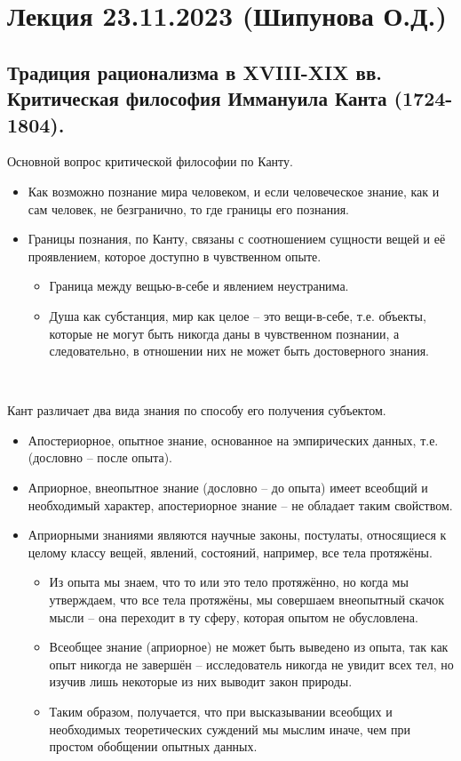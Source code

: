 \documentclass[main.tex]{subfiles}
\begin{document}
\section{Лекция 23.11.2023 (Шипунова О.Д.)}



\subsection{Традиция рационализма в XVIII-XIX вв. Критическая философия Иммануила Канта (1724-1804).}

{\parindent0pt
Основной вопрос критической философии по Канту.
\begin{itemize}[nosep,leftmargin=0.5cm]
\item Как возможно познание мира человеком, и если человеческое знание, как и сам человек, не безгранично, то где границы его познания.
\item Границы познания, по Канту, связаны с соотношением сущности вещей и её проявлением, которое доступно в чувственном опыте.
\begin{itemize}[nosep,leftmargin=0.6cm]
\item Граница между вещью-в-себе и явлением неустранима.
\item Душа как субстанция, мир как целое -- это вещи-в-себе, т.е. объекты, которые не могут быть никогда даны в чувственном познании, а следовательно, в отношении них не может быть достоверного знания.
\end{itemize}
\end{itemize}
}
\ 

{\parindent0pt
Кант различает два вида знания по способу его получения субъектом.
\begin{itemize}[nosep,leftmargin=0.5cm]
\item Апостериорное, опытное знание, основанное на эмпирических данных, т.е. (дословно -- после опыта).
\item Априорное, внеопытное знание (дословно -- до опыта) имеет всеобщий и необходимый характер, апостериорное знание -- не обладает таким свойством.
\item Априорными знаниями являются научные законы, постулаты, относящиеся к целому классу вещей, явлений, состояний, например, все тела протяжёны.
\begin{itemize}[nosep,leftmargin=0.6cm]
\item Из опыта мы знаем, что то или это тело протяжённо, но когда мы утверждаем, что все тела протяжёны, мы совершаем внеопытный скачок мысли -- она переходит в ту сферу, которая опытом не обусловлена.
\item Всеобщее знание (априорное) не может быть выведено из опыта, так как опыт никогда не завершён -- исследователь никогда не увидит всех тел, но изучив лишь некоторые из них выводит закон природы.
\item Таким образом, получается, что при высказывании всеобщих и необходимых теоретических суждений мы мыслим иначе, чем при простом обобщении опытных данных.
\end{itemize}
\end{itemize}
}
\end{document}
